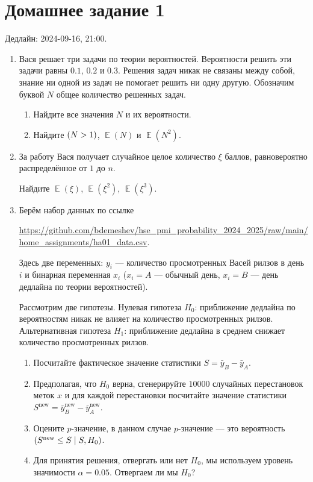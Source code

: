\documentclass[12pt]{article}
\let\P\relax
\DeclareMathOperator{\P}{\mathbb{P}}
\DeclareMathOperator{\E}{\mathbb{E}}
\begin{document}
\section*{Домашнее задание 1}

Дедлайн: 2024-09-16, 21:00.

\begin{enumerate}
\item Вася решает три задачи по теории вероятностей. 
Вероятности решить эти задачи равны $0.1$, $0.2$ и $0.3$. 
Решения задач никак не связаны между собой, знание ни одной из задач не помогает решить ни одну другую.
Обозначим буквой $N$ общее количество решенных задач. 

\begin{enumerate}
    \item Найдите все значения $N$ и их вероятности. 
    \item Найдите $\P(N > 1)$, $\E(N)$ и $\E(N^2)$.
\end{enumerate}

\item За работу Вася получает случайное целое количество $\xi$ баллов, равновероятно распределённое от $1$ до $n$. 

Найдите $\E(\xi)$, $\E(\xi^2)$, $\E(\xi^3)$.

\item Берём набор данных по ссылке 

\url{https://github.com/bdemeshev/hse_pmi_probability_2024_2025/raw/main/home_assignments/ha01_data.csv}.

Здесь две переменных: $y_i$ — количество просмотренных Васей рилзов в день $i$ 
и бинарная переменная $x_i$ ($x_i = A$ — обычный день, $x_i = B$ — день дедлайна по теории вероятностей).

Рассмотрим две гипотезы. 
Нулевая гипотеза $H_0$: приближение дедлайна по вероятностям никак не влияет на количество просмотренных рилзов.
Альтернативная гипотеза $H_1$: приближение дедлайна в среднем снижает количество просмотренных рилзов. 

\begin{enumerate}
    \item Посчитайте фактическое значение статистики $S = \bar y_B - \bar y_A$.
    \item Предполагая, что $H_0$ верна, сгенерируйте $10000$ случайных перестановок меток $x$ и для 
    каждой перестановки посчитайте значение статистики $S^{\text{new}} = \bar y_B^{\text{new}} - \bar y_A^{\text{new}}$.
    \item Оцените $p$-значение, в данном случае $p$-значение — это вероятность $\P(S^{\text{new}} \leq S \mid S, H_0)$.
    \item Для принятия решения, отвергать или нет $H_0$, мы используем уровень значимости $\alpha = 0.05$.
    Отвергаем ли мы $H_0$?
\end{enumerate}

\end{enumerate}
\end{document}
